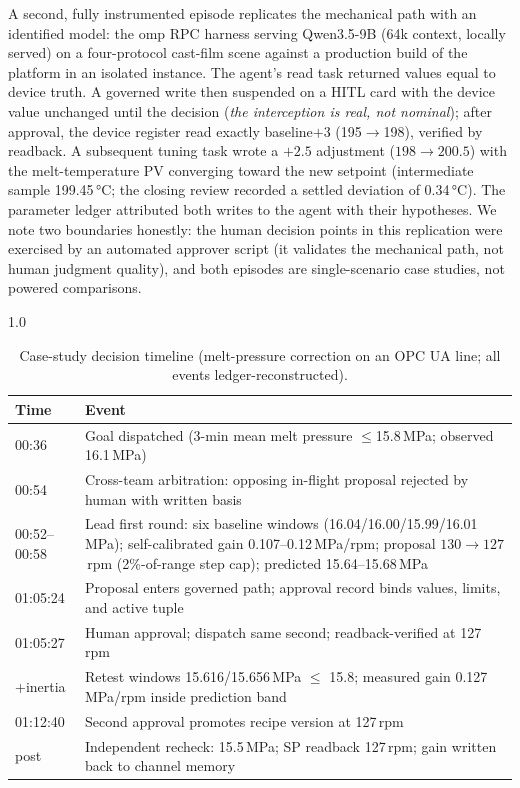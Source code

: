 A second, fully instrumented episode replicates the mechanical path with
an identified model: the omp RPC harness serving Qwen3.5-9B (64k context,
locally served) on a four-protocol cast-film scene against a production
build of the platform in an isolated instance. The agent's read task
returned values equal to device truth. A governed write then suspended
on a HITL card with the device value unchanged until the decision
(\emph{the interception is real, not nominal}); after approval, the
device register read exactly baseline$+3$ (195$\to$198), verified by
readback. A subsequent tuning task wrote a $+2.5$ adjustment
($198 \to 200.5$) with the melt-temperature PV converging toward the new
setpoint (intermediate sample 199.45\,°C; the closing review recorded a
settled deviation of 0.34\,°C). The parameter ledger attributed both
writes to the agent with their hypotheses. We note two boundaries
honestly: the human decision points in this replication were exercised
by an automated approver script (it validates the mechanical path, not
human judgment quality), and both episodes are single-scenario case
studies, not powered comparisons.

\begin{table}[!t]
\centering
\caption{Case-study decision timeline (melt-pressure correction on an
OPC UA line; all events ledger-reconstructed).}
\label{tab:casestudy}
\small
\begin{spacing}{1.0}
\begin{tabularx}{\columnwidth}{@{}p{}X@{}}
\toprule
Time & Event \\
\midrule
00:36 & Goal dispatched (3-min mean melt pressure $\leq$15.8\,MPa; observed 16.1\,MPa) \\
00:54 & Cross-team arbitration: opposing in-flight proposal rejected by human with written basis \\
00:52--00:58 & Lead first round: six baseline windows (16.04/16.00/15.99/16.01\,MPa); self-calibrated gain 0.107--0.12\,MPa/rpm; proposal $130\to127$\,rpm (2\%-of-range step cap); predicted 15.64--15.68\,MPa \\
01:05:24 & Proposal enters governed path; approval record binds values, limits, and active tuple \\
01:05:27 & Human approval; dispatch same second; readback-verified at 127\,rpm \\
+inertia & Retest windows 15.616/15.656\,MPa $\leq$ 15.8; measured gain 0.127\,MPa/rpm inside prediction band \\
01:12:40 & Second approval promotes recipe version at 127\,rpm \\
post & Independent recheck: 15.5\,MPa; SP readback 127\,rpm; gain written back to channel memory \\
\bottomrule
\end{tabularx}
\end{spacing}
\end{table}

